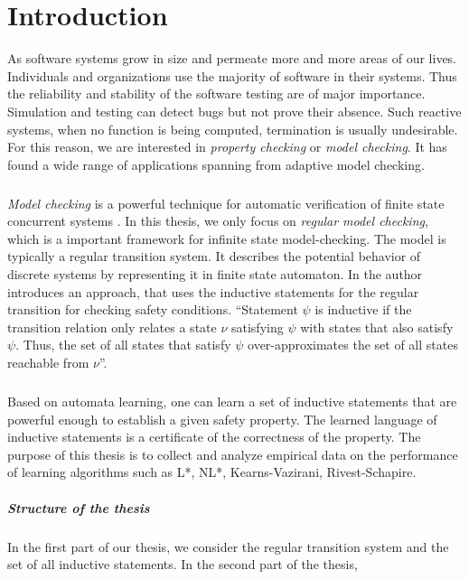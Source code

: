 
\chapter{Introduction}\label{chapter:introduction}
As software systems grow in size and permeate more and more areas of our lives.
Individuals and organizations use the majority of software in their systems. Thus the 
reliability and stability of the software testing are of major importance. Simulation 
and testing can detect bugs but not prove their absence. Such reactive 
systems, when no function is being computed, termination is usually undesirable. For 
this reason, we are interested in \textit{property checking} or \textit{model checking}. 
It has found a wide range of applications spanning from adaptive model checking.
\paragraph*{}
\textit{Model checking} is a powerful technique for automatic verification of finite state 
concurrent systems \cite{clarke2009model}. 
In this thesis, we only focus on \textit{regular model checking}, which is a important 
framework for infinite state model-checking. The model is typically a regular 
transition system. It describes the potential behavior of discrete systems by representing 
it in finite state automaton. In \cite{clarke2009model} the author introduces an approach, 
that uses the inductive statements for the regular transition for checking 
safety conditions. ``Statement $\psi$ is inductive if the transition relation only relates 
a state $\nu$ satisfying $\psi$ with states that also satisfy $\psi$. Thus, the set of 
all states that satisfy $\psi$ over-approximates the set of all states reachable from $\nu$''.

\paragraph*{}
Based on automata learning, one can learn a set of inductive statements that are powerful 
enough to establish a given safety property.
The learned language of inductive statements is a certificate of the correctness of the 
property. The purpose of this thesis is to collect and analyze empirical data on 
the performance of learning algorithms such as L*, NL*, Kearns-Vazirani, Rivest-Schapire.


\paragraph*{Structure of the thesis}
\paragraph*{}

In the first part of our thesis, we consider the regular transition system and 
the set of all inductive statements. In the second part of the thesis,